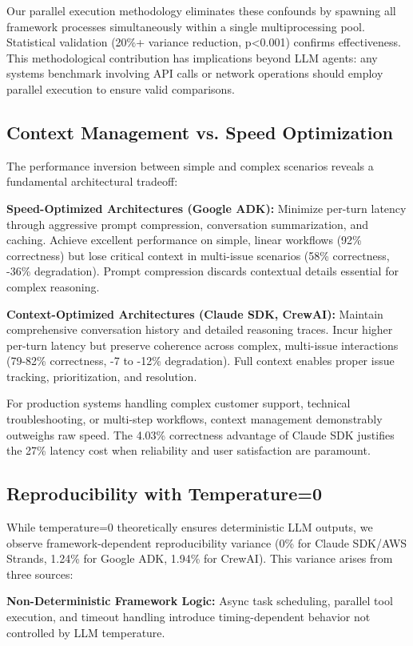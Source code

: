 \documentclass[sigconf,nonacm]{acmart}
\begin{document}
Our parallel execution methodology eliminates these confounds by spawning all framework processes simultaneously within a single multiprocessing pool. Statistical validation (20\%+ variance reduction, p<0.001) confirms effectiveness. This methodological contribution has implications beyond LLM agents: any systems benchmark involving API calls or network operations should employ parallel execution to ensure valid comparisons.

\subsection{Context Management vs. Speed Optimization}

The performance inversion between simple and complex scenarios reveals a fundamental architectural tradeoff:

\textbf{Speed-Optimized Architectures (Google ADK):} Minimize per-turn latency through aggressive prompt compression, conversation summarization, and caching. Achieve excellent performance on simple, linear workflows (92\% correctness) but lose critical context in multi-issue scenarios (58\% correctness, -36\% degradation). Prompt compression discards contextual details essential for complex reasoning.

\textbf{Context-Optimized Architectures (Claude SDK, CrewAI):} Maintain comprehensive conversation history and detailed reasoning traces. Incur higher per-turn latency but preserve coherence across complex, multi-issue interactions (79-82\% correctness, -7 to -12\% degradation). Full context enables proper issue tracking, prioritization, and resolution.

For production systems handling complex customer support, technical troubleshooting, or multi-step workflows, context management demonstrably outweighs raw speed. The 4.03\% correctness advantage of Claude SDK justifies the 27\% latency cost when reliability and user satisfaction are paramount.

\subsection{Reproducibility with Temperature=0}

While temperature=0 theoretically ensures deterministic LLM outputs, we observe framework-dependent reproducibility variance (0\% for Claude SDK/AWS Strands, 1.24\% for Google ADK, 1.94\% for CrewAI). This variance arises from three sources:

\textbf{Non-Deterministic Framework Logic:} Async task scheduling, parallel tool execution, and timeout handling introduce timing-dependent behavior not controlled by LLM temperature.
\end{document}
